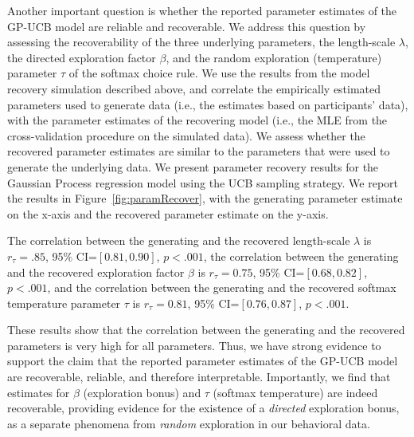 Another important question is whether the reported parameter estimates of the GP-UCB model are reliable and recoverable. We address this question by assessing the recoverability of the three underlying parameters, the length-scale $\lambda$, the directed exploration factor $\beta$, and the random exploration (temperature) parameter $\tau$ of the softmax choice rule. We use the results from the model recovery simulation described above, and correlate the empirically estimated parameters used to generate data (i.e., the estimates based on participants' data), with the parameter estimates of the recovering model (i.e., the MLE from the cross-validation procedure on the simulated data). We assess whether the recovered parameter estimates are similar to the parameters that were used to generate the underlying data. We present parameter recovery results for the Gaussian Process regression model using the UCB sampling strategy. We report the results in Figure~\ref{fig:paramRecover}, with the generating parameter estimate on the x-axis and the recovered parameter estimate on the y-axis.

The correlation between the generating and the recovered length-scale $\lambda$ is $r_\tau=.85$, 95\% CI=$[0.81,0.90]$, $p<.001$, the correlation between the generating and the recovered exploration factor $\beta$ is $r_\tau=0.75$, 95\% CI=$[0.68,0.82]$, $p<.001$, and the correlation between the generating and the recovered softmax temperature parameter $\tau$ is $r_\tau=0.81$, 95\% CI=$[0.76,0.87]$, $p<.001$. 

These results show that the correlation between the generating and the recovered parameters is very high for all parameters. Thus, we have strong evidence to support the claim that the reported parameter estimates of the GP-UCB model are recoverable, reliable, and therefore interpretable. Importantly, we find that estimates for $\beta$ (exploration bonus) and $\tau$ (softmax temperature) are indeed recoverable, providing evidence for the existence of a \emph{directed} exploration bonus, as a separate phenomena from \emph{random} exploration in our behavioral data.

